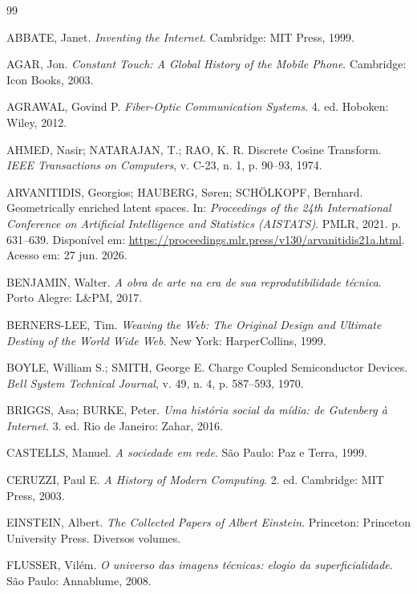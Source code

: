 \documentclass{hipatia}
\begin{document}
{\fontsize{11}{11}\selectfont
\begin{thebibliography}{99}

ABBATE, Janet.
\textit{Inventing the Internet}.
Cambridge: MIT Press, 1999.

AGAR, Jon.
\textit{Constant Touch: A Global History of the Mobile Phone}.
Cambridge: Icon Books, 2003.

AGRAWAL, Govind P.
\textit{Fiber-Optic Communication Systems}.
4. ed.
Hoboken: Wiley, 2012.

AHMED, Nasir; NATARAJAN, T.; RAO, K. R.
Discrete Cosine Transform.
\textit{IEEE Transactions on Computers},
v. C-23, n. 1, p. 90--93, 1974.

ARVANITIDIS, Georgios; HAUBERG, Søren; SCHÖLKOPF, Bernhard.
Geometrically enriched latent spaces.
In: \textit{Proceedings of the 24th International Conference on Artificial Intelligence and Statistics (AISTATS)}.
PMLR, 2021.
p. 631--639.
Disponível em:
\url{https://proceedings.mlr.press/v130/arvanitidis21a.html}.
Acesso em: 27 jun. 2026.

BENJAMIN, Walter.
\textit{A obra de arte na era de sua reprodutibilidade técnica}.
Porto Alegre: L\&PM, 2017.

BERNERS-LEE, Tim.
\textit{Weaving the Web: The Original Design and Ultimate Destiny of the World Wide Web}.
New York: HarperCollins, 1999.

BOYLE, William S.; SMITH, George E.
Charge Coupled Semiconductor Devices.
\textit{Bell System Technical Journal},
v. 49, n. 4, p. 587--593, 1970.

BRIGGS, Asa; BURKE, Peter.
\textit{Uma história social da mídia: de Gutenberg à Internet}.
3. ed.
Rio de Janeiro: Zahar, 2016.

CASTELLS, Manuel.
\textit{A sociedade em rede}.
São Paulo: Paz e Terra, 1999.

CERUZZI, Paul E.
\textit{A History of Modern Computing}.
2. ed.
Cambridge: MIT Press, 2003.

EINSTEIN, Albert.
\textit{The Collected Papers of Albert Einstein}.
Princeton: Princeton University Press.
Diversos volumes.

FLUSSER, Vilém.
\textit{O universo das imagens técnicas: elogio da superficialidade}.
São Paulo: Annablume, 2008.


\end{thebibliography}}
\end{document}
